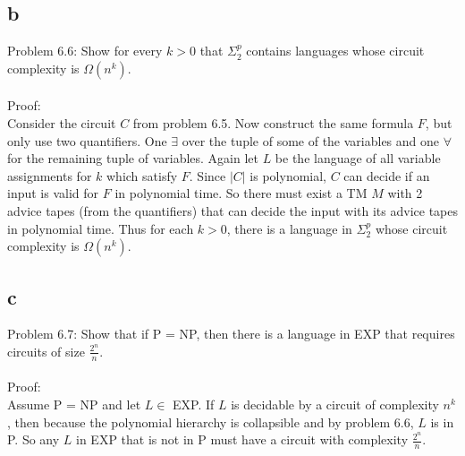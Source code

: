 \documentclass[letterpaper,notitlepage,twoside]{article}
\begin{document}
\subsection*{b}
Problem 6.6: Show for every $k > 0$ that $\Sigma_2^p$ contains languages whose circuit complexity is $\Omega\left(n^k\right)$.
\\\\
Proof:
\\
Consider the circuit $C$ from problem 6.5. Now construct the same formula $F$, but only use two quantifiers. One $\exists$ over the tuple of some of the variables and one $\forall$ for the remaining tuple of variables. Again let $L$ be the language of all variable assignments for $k$ which satisfy $F$. Since $\left| C \right|$ is polynomial, $C$ can decide if an input is valid for $F$ in polynomial time. So there must exist a TM $M$ with 2 advice tapes (from the quantifiers) that can decide the input with its advice tapes in polynomial time. Thus for each $k > 0$, there is a language in $\Sigma_2^p$ whose circuit complexity is $\Omega\left(n^k\right)$.

\subsection*{c}
Problem 6.7: Show that if P = NP, then there is a language in EXP that requires circuits of size $\frac{2^n}{n}$.
\\\\
Proof:
\\
Assume P = NP and let $L \in $ EXP. If $L$ is decidable by a circuit of complexity $n^k$, then because the polynomial hierarchy is collapsible and by problem 6.6, $L$ is in P. So any $L$ in EXP that is not in P must have a circuit with complexity $\frac{2^n}{n}$.
\end{document}
